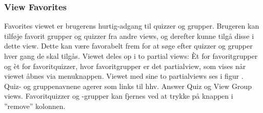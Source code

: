 \subsubsection{View Favorites}
Favorites viewet er brugerens hurtig-adgang til quizzer og grupper. Brugeren kan tilføje favorit grupper og quizzer fra andre views, og derefter kunne tilgå disse i dette view. Dette kan være favorabelt frem for at søge efter quizzer og grupper hver gang de skal tilgås. \newline
Viewet deles op i to partial views: Èt for favoritgrupper og èt for favoritquizzer, hvor favoritgrupper er det partialview, som vises når viewet åbnes via menuknappen. Viewet med sine to partialviews ses i figur .
Quiz- og gruppenavnene agerer som links til hhv. Answer Quiz og View Group views. Favoritquizzer og -grupper kan fjernes ved at trykke på knappen i ''remove'' kolonnen.